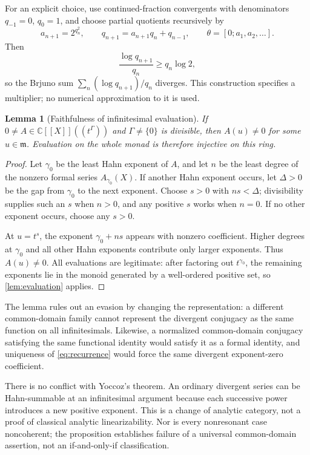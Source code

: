 \documentclass[11pt,letterpaper]{article}
\numberwithin{equation}{section}
\theoremstyle{plain}
\newtheorem{lemma}[theorem]{Lemma}
\theoremstyle{definition}
\theoremstyle{remark}
\newcommand{\C}{\mathbb C}
\newcommand{\mm}{\mathfrak m}
\begin{document}
For an explicit choice, use continued-fraction convergents with denominators
$q_{-1}=0$, $q_0=1$, and choose partial quotients recursively by
\[
 a_{n+1}=2^{q_n^2},\qquad
 q_{n+1}=a_{n+1}q_n+q_{n-1},\qquad
 \theta=[0;a_1,a_2,\ldots].
\]
Then
\[
 \frac{\log q_{n+1}}{q_n}\ge q_n\log2,
\]
so the Brjuno sum $\sum_n(\log q_{n+1})/q_n$ diverges. This construction
specifies a multiplier; no numerical approximation to it is used.

\begin{lemma}[Faithfulness of infinitesimal evaluation]\label{lem:faithful}
If $0\ne A\in\C[[X]]((t^\Gamma))$ and $\Gamma\ne\{0\}$ is divisible,
then $A(u)\ne0$ for some $u\in\mm$. Evaluation on the whole monad is
therefore injective on this ring.
\end{lemma}

\begin{proof}
Let $\gamma_0$ be the least Hahn exponent of $A$, and let $n$ be the
least degree of the nonzero formal series $A_{\gamma_0}(X)$.
If another Hahn exponent occurs, let $\Delta>0$ be the gap from $\gamma_0$
to the next exponent. Choose $s>0$ with $ns<\Delta$; divisibility supplies
such an $s$ when $n>0$, and any positive $s$ works when $n=0$.
If no other exponent occurs, choose any $s>0$.

At $u=t^s$, the exponent $\gamma_0+ns$ appears with nonzero coefficient.
Higher degrees at $\gamma_0$ and all other Hahn exponents contribute only
larger exponents. Thus $A(u)\ne0$.
All evaluations are legitimate: after factoring out $t^{\gamma_0}$,
the remaining exponents lie in the monoid generated by a well-ordered
positive set, so \cref{lem:evaluation} applies.
\end{proof}

The lemma rules out an evasion by changing the representation: a different
common-domain family cannot represent the divergent conjugacy as the same
function on all infinitesimals. Likewise, a normalized common-domain
conjugacy satisfying the same functional identity would satisfy it as a
formal identity, and uniqueness of \eqref{eq:recurrence} would force the
same divergent exponent-zero coefficient.

There is no conflict with Yoccoz's theorem. An ordinary divergent series can
be Hahn-summable at an infinitesimal argument because each successive power
introduces a new positive exponent. This is a change of analytic category,
not a proof of classical analytic linearizability. Nor is every nonresonant
case noncoherent; the proposition establishes failure of a universal
common-domain assertion, not an if-and-only-if classification.
\end{document}
